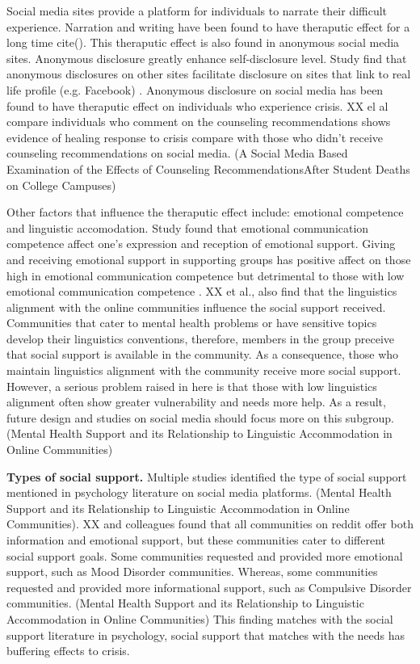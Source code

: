Social media sites provide a platform for individuals to narrate their difficult experience. Narration and writing have been found to have theraputic effect for a long time cite(). This theraputic effect is also found in anonymous social media sites. Anonymous disclosure greatly enhance self-disclosure level. Study find that anonymous disclosures on other sites facilitate disclosure on sites that link to real life profile (e.g. Facebook) \cite{andalibi2018announcing}. Anonymous disclosure on social media has been found to have theraputic effect on individuals who experience crisis. XX el al compare individuals who comment on the counseling recommendations shows evidence of healing response to crisis compare with those who didn't receive counseling recommendations on social media.  (A Social Media Based Examination of the Effects of Counseling RecommendationsAfter Student Deaths on College Campuses) 

Other factors that influence the theraputic effect include: emotional competence and linguistic accomodation. Study found that emotional communication competence affect one's expression and reception of emotional support. Giving and receiving emotional support in supporting groups has positive affect on those high in emotional communication competence but detrimental to those with low emotional communication competence \cite{yoo2014giving}. XX et al., also find that the linguistics alignment with the online communities influence the social support received. Communities that cater to mental health problems or have sensitive topics develop their linguistics conventions, therefore, members in the group preceive that social support is available in the community. As a consequence, those who maintain linguistics alignment with the community receive more social support. However, a serious problem raised in here is that those with low linguistics alignment often show greater vulnerability and needs more help. As a result, future design and studies on social media should focus more on this subgroup. (Mental Health Support and its Relationship to Linguistic Accommodation in Online Communities)

\textbf{Types of social support.}
Multiple studies identified the type of social support mentioned in psychology literature on social media platforms. \cite{yoo2014giving}(Mental Health Support and its Relationship to
Linguistic Accommodation in Online Communities). XX and colleagues found that all communities on reddit offer both information and emotional support, but these communities cater to different social support goals. Some communities requested and provided more emotional support, such as Mood Disorder communities. Whereas, some communities requested and provided more informational support, such as Compulsive Disorder communities. (Mental Health Support and its Relationship to
Linguistic Accommodation in Online Communities) This finding matches with the social support literature in psychology, social support that matches with the needs has buffering effects to crisis.

